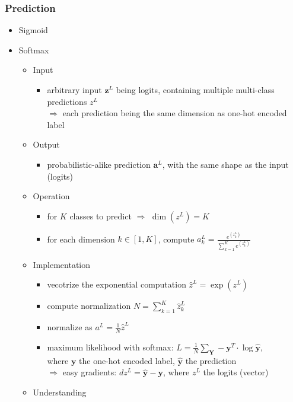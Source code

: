 \subsubsection{Prediction}
\begin{itemize}
\item Sigmoid

\item Softmax
	\begin{itemize}
	\item Input
		\begin{itemize}
		\item arbitrary input $\mathbf z^{L}$ being logits, containing multiple multi-class predictions $z^{L}$ \\
		$\Rightarrow$ each prediction being the same dimension as one-hot encoded label
		\end{itemize}
	\item Output
		\begin{itemize}
		\item probabilistic-alike prediction $\mathbf a^L$, with the same shape as the input (logits)
		\end{itemize}
	\item Operation
		\begin{itemize}
		\item for $K$ classes to predict $\Rightarrow$ $\dim (z^L)=K$
		\item for each dimension $k\in[1,K]$, compute $\displaystyle a^L_k=\frac{e^{(z^L_k)}}{\displaystyle \sum_{k=1}^K e^{(z^L_k)}}$
		\end{itemize}
	\item Implementation
		\begin{itemize}
		\item vecotrize the exponential computation $\hat z^L = \exp{(z^L)}$
		\item compute normalization $N=\displaystyle \sum_{k=1}^K {\hat z^L_k}$
		\item normalize as $a^L=\frac 1N \hat z^L$
		\item maximum likelihood with softmax: $\displaystyle L = \frac 1N \sum_{\mathbf Y}-\mathbf y^T \cdot \log \hat {\mathbf y}$, \\
		where $\mathbf y$ the one-hot encoded label, $\hat {\mathbf y}$ the prediction \\
		$\Rightarrow$ easy gradients: $dz^L = \hat{\mathbf y} - \mathbf y$, where $z^L$ the logits (vector)
		\end{itemize}
	\item Understanding

\end{itemize}
\end{itemize}
